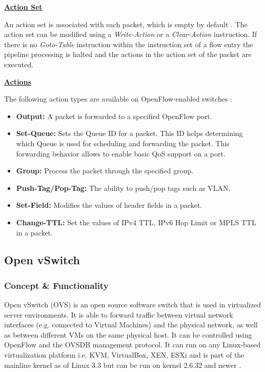 \underline{\textbf{Action Set}}

An action set is associated with each packet, which is empty by default \cite{ofspecification}. The action set can be modified using a \textit{Write-Action} or a \textit{Clear-Action} instruction. If there is no \textit{Goto-Table} instruction within the instruction set of a flow entry the pipeline processing is halted and the actions in the action set of the packet are executed.


\underline{\textbf{Actions}}

The following action types are available on OpenFlow-enabled switches \cite{ofspecification}:
\begin{itemize}
\item \textbf{Output:} A packet is forwarded to a specified OpenFlow port.
\item \textbf{Set-Queue:} Sets the Queue ID for a packet. This ID helps determining which Queue is used for scheduling and forwarding the packet. This forwarding behavior allows to enable basic QoS support on a port.
\item \textbf{Group:} Process the packet through the specified group.
\item \textbf{Push-Tag/Pop-Tag:} The ability to push/pop tags such as VLAN.
\item \textbf{Set-Field:} Modifies the values of header fields in a packet.
\item \textbf{Change-TTL:} Set the values of IPv4 TTL, IPv6 Hop Limit or MPLS TTL in a packet.
\end{itemize} 

\subsection{Open vSwitch}

\subsubsection{Concept \& Functionality}

Open vSwitch (OVS) is an open source software switch that is used in virtualized server environments. It is able to forward traffic between virtual network interfaces (e.g. connected to Virtual Machines) and the physical network, as well as between different VMs on the same physical host. It can be controlled using OpenFlow and the OVSDB management protocol. It can run on any Linux-based virtualization platform i.e. KVM, VirtualBox, XEN, ESXi and is part of the mainline kernel as of Linux 3.3 but can be run on kernel 2.6.32 and newer \cite{ovs-faq}.

